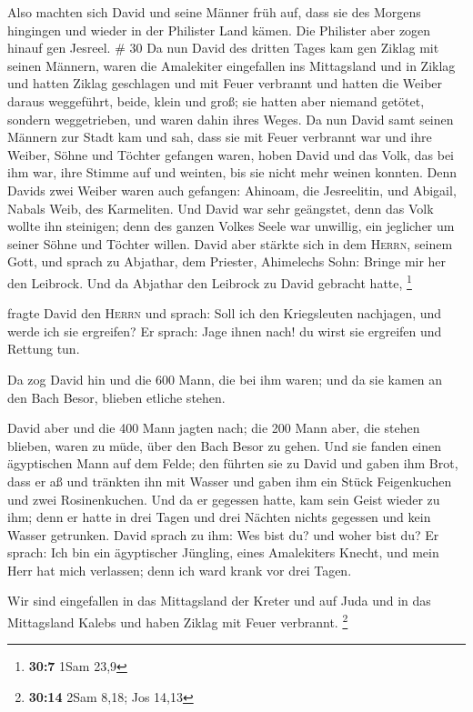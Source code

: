  Also machten sich David und seine Männer früh auf, dass
sie des Morgens hingingen und wieder in der Philister Land kämen. Die
Philister aber zogen hinauf gen Jesreel. \# 30  Da nun
David des dritten Tages kam gen Ziklag mit seinen Männern, waren die
Amalekiter eingefallen ins Mittagsland und in Ziklag und hatten Ziklag
geschlagen und mit Feuer verbrannt  und hatten die Weiber
daraus weggeführt, beide, klein und groß; sie hatten aber niemand
getötet, sondern weggetrieben, und waren dahin ihres Weges.
 Da nun David samt seinen Männern zur Stadt kam und sah,
dass sie mit Feuer verbrannt war und ihre Weiber, Söhne und Töchter
gefangen waren,  hoben David und das Volk, das bei ihm
war, ihre Stimme auf und weinten, bis sie nicht mehr weinen konnten.
 Denn Davids zwei Weiber waren auch gefangen: Ahinoam, die
Jesreelitin, und Abigail, Nabals Weib, des Karmeliten. 
Und David war sehr geängstet, denn das Volk wollte ihn steinigen; denn
des ganzen Volkes Seele war unwillig, ein jeglicher um seiner Söhne und
Töchter willen. David aber stärkte sich in dem \textsc{Herrn}, seinem
Gott,  und sprach zu Abjathar, dem Priester, Ahimelechs
Sohn: Bringe mir her den Leibrock. Und da Abjathar den Leibrock zu David
gebracht hatte, \footnote{\textbf{30:7} 1Sam 23,9}

 fragte David den \textsc{Herrn} und sprach: Soll ich den
Kriegsleuten nachjagen, und werde ich sie ergreifen? Er sprach: Jage
ihnen nach! du wirst sie ergreifen und Rettung tun.

 Da zog David hin und die 600 Mann, die bei ihm waren; und
da sie kamen an den Bach Besor, blieben etliche stehen.

 David aber und die 400 Mann jagten nach; die 200 Mann
aber, die stehen blieben, waren zu müde, über den Bach Besor zu gehen.
 Und sie fanden einen ägyptischen Mann auf dem Felde; den
führten sie zu David und gaben ihm Brot, dass er aß und tränkten ihn mit
Wasser  und gaben ihm ein Stück Feigenkuchen und zwei
Rosinenkuchen. Und da er gegessen hatte, kam sein Geist wieder zu ihm;
denn er hatte in drei Tagen und drei Nächten nichts gegessen und kein
Wasser getrunken.  David sprach zu ihm: Wes bist du? und
woher bist du? Er sprach: Ich bin ein ägyptischer Jüngling, eines
Amalekiters Knecht, und mein Herr hat mich verlassen; denn ich ward
krank vor drei Tagen.

 Wir sind eingefallen in das Mittagsland der Kreter und
auf Juda und in das Mittagsland Kalebs und haben Ziklag mit Feuer
verbrannt. \footnote{\textbf{30:14} 2Sam 8,18; Jos 14,13}

